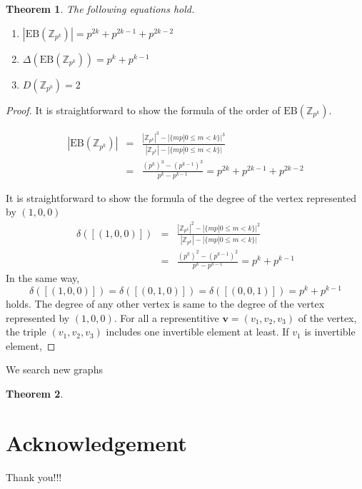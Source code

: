 \documentclass{article}
\newtheorem*{Th}{Theorem}
\newcommand{\Z}{\mathbb Z}
\newcommand{\EB}{\mathrm{EB}}
\begin{document}
\begin{Th}
The following equations hold.
\begin{enumerate}
\item $ |\EB(\Z_{p^k})| = p^{2k}+p^{2k-1}+p^{2k-2} $
\item $ \Delta(\EB(\Z_{p^k})) = p^k + p^{k-1} $
\item $ D(\Z_{p^k}) = 2$
\end{enumerate}
\end{Th}

\begin{proof}
It is straightforward to show the formula of the order of $\EB(\Z_{p^k})$.

\begin{eqnarray*}
|\EB(\Z_{p^k})| & = & \frac{|\Z_{p^k}|^3 - |\{ mp | 0 \leq m < k \}|^3}{|\Z_{p^k}|-|\{ mp | 0 \leq m < k \}|} \\ 
& = & \frac{(p^k)^3 - (p^{k-1})^3}{p^k-p^{k-1}} = p^{2k}+p^{2k-1}+p^{2k-2}
\end{eqnarray*}

It is straightforward to show the formula of the degree of the vertex represented by $(1,0,0)$
\begin{eqnarray*}
\delta([(1,0,0)]) & = & \frac{|\Z_{p^k}|^2 - |\{ mp | 0 \leq m < k \}|^2 }{|\Z_{p^k}|-|\{ mp | 0 \leq m < k \}|} \\
& = & \frac{(p^k)^2 - (p^{k-1})^2}{p^k-p^{k-1}} = p^k + p^{k-1}
\end{eqnarray*}
In the same way, 
\[\delta([(1,0,0)])=\delta([(0,1,0)])=\delta([(0,0,1)]) = p^k + p^{k-1}\]
holds.
The degree of any other vertex is same to the degree of the vertex represented by $(1,0,0)$. 
For all a representitive ${\bm v} = (v_1,v_2,v_3)$ of the vertex, the triple $(v_1,v_2,v_3)$ includes one invertible element at least. If $v_1$ is invertible element, 

\end{proof}

We search new graphs 

\begin{Th}
\end{Th}

\section{Acknowledgement}
Thank you!!!
\end{document}
